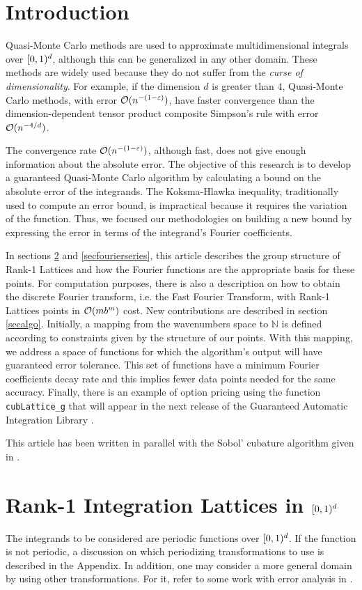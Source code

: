 \documentclass[graybox]{svmult}
\newcommand{\N}{\mathbb{N}} %
\begin{document}
\section{Introduction}
Quasi-Monte Carlo methods are used to approximate multidimensional integrals over $[0,1)^d$, although this can be generalized in any other domain. These methods are widely used because they do not suffer from the \textit{curse of dimensionality}. For example, if the dimension $d$ is greater than $4$, Quasi-Monte Carlo methods, with error $\mathcal{O}(n^{-(1-\varepsilon)})$, have faster convergence than the dimension-dependent tensor product composite Simpson's rule with error $\mathcal{O}(n^{-4/d})$.

The convergence rate $\mathcal{O}(n^{-(1-\varepsilon)})$, although fast, does not give enough information about the absolute error. The objective of this research is to develop a guaranteed Quasi-Monte Carlo algorithm by calculating a bound on the absolute error of the integrands. The Koksma-Hlawka inequality, traditionally used to compute an error bound, is impractical because it requires the variation of the function. Thus, we focused our methodologies on building a new bound by expressing the error in terms of the integrand's Fourier coefficients. 

In sections \ref{secrank1lat} and \ref{secfourierseries}, this article describes the group structure of Rank-1 Lattices and how the Fourier functions are the appropriate basis for these points. For computation purposes, there is also a description on how to obtain the discrete Fourier transform, i.e. the Fast Fourier Transform, with Rank-1 Lattices points in $\mathcal{O}(mb^m)$ cost. New contributions are described in section \ref{secalgo}. Initially, a mapping from the wavenumbers space to $\N$ is defined according to constraints given by the structure of our points. With this mapping, we address a space of functions for which the algorithm's output will have guaranteed error tolerance. This set of functions have a minimum Fourier coefficients decay rate and this implies fewer data points needed for the same accuracy. Finally, there is an example of option pricing using the function \texttt{cubLattice\_g} that will appear in the next release of the Guaranteed Automatic Integration Library \cite{ChoEtal14a}.

This article has been written in parallel with the Sobol' cubature algorithm given in \cite{HicJim16a}.

\section{Rank-1 Integration Lattices in $[0,1)^d$}\label{secrank1lat}
The integrands to be considered are periodic functions over $[0,1)^d$. If the function is not periodic, a discussion on which periodizing transformations to use is described in the Appendix. In addition, one may consider a more general domain by using other transformations. For it, refer to some work with error analysis in \cite{HicSloWas03a,HicSloWas03e}.
\end{document}
